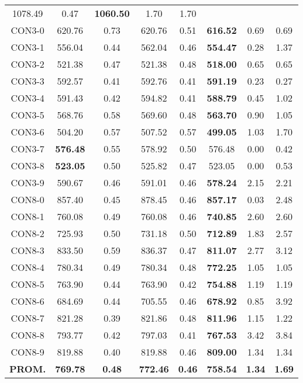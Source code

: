 \begin{table}[ht]
\begin{tabular}{c c c c c c c c}
1078.49 & 0.47 & \bf{1060.50} & 
1.70 & 1.70\\CON3-0 & 620.76 & 0.73 & 
620.76 & 0.51 & \bf{616.52} & 
0.69 & 0.69\\CON3-1 & 556.04 & 0.44 & 
562.04 & 0.46 & \bf{554.47} & 
0.28 & 1.37\\CON3-2 & 521.38 & 0.47 & 
521.38 & 0.48 & \bf{518.00} & 
0.65 & 0.65\\CON3-3 & 592.57 & 0.41 & 
592.76 & 0.41 & \bf{591.19} & 
0.23 & 0.27\\CON3-4 & 591.43 & 0.42 & 
594.82 & 0.41 & \bf{588.79} & 
0.45 & 1.02\\CON3-5 & 568.76 & 0.58 & 
569.60 & 0.48 & \bf{563.70} & 
0.90 & 1.05\\CON3-6 & 504.20 & 0.57 & 
507.52 & 0.57 & \bf{499.05} & 
1.03 & 1.70\\CON3-7 & \bf{576.48} & 0.55 & 
578.92 & 0.50 & 576.48 & 0.00
 & 0.42\\CON3-8 & \bf{523.05} & 0.50 & 
525.82 & 0.47 & 523.05 & 0.00
 & 0.53\\CON3-9 & 590.67 & 0.46 & 
591.01 & 0.46 & \bf{578.24} & 
2.15 & 2.21\\CON8-0 & 857.40 & 0.45 & 
878.45 & 0.46 & \bf{857.17} & 
0.03 & 2.48\\CON8-1 & 760.08 & 0.49 & 
760.08 & 0.46 & \bf{740.85} & 
2.60 & 2.60\\CON8-2 & 725.93 & 0.50 & 
731.18 & 0.50 & \bf{712.89} & 
1.83 & 2.57\\CON8-3 & 833.50 & 0.59 & 
836.37 & 0.47 & \bf{811.07} & 
2.77 & 3.12\\CON8-4 & 780.34 & 0.49 & 
780.34 & 0.48 & \bf{772.25} & 
1.05 & 1.05\\CON8-5 & 763.90 & 0.44 & 
763.90 & 0.42 & \bf{754.88} & 
1.19 & 1.19\\CON8-6 & 684.69 & 0.44 & 
705.55 & 0.46 & \bf{678.92} & 
0.85 & 3.92\\CON8-7 & 821.28 & 0.39 & 
821.86 & 0.48 & \bf{811.96} & 
1.15 & 1.22\\CON8-8 & 793.77 & 0.42 & 
797.03 & 0.41 & \bf{767.53} & 
3.42 & 3.84\\CON8-9 & 819.88 & 0.40 & 
819.88 & 0.46 & \bf{809.00} & 
1.34 & 1.34\\\bf{PROM.} & 
\bf{769.78} & \bf{0.48} & \bf{772.46} & \bf{0.46} & \bf{758.54} & \bf{1.34} & \bf{1.69}\\[1ex]\hline
\end{tabular}
\label{table:GA-M-10-10}
\end{table} 

